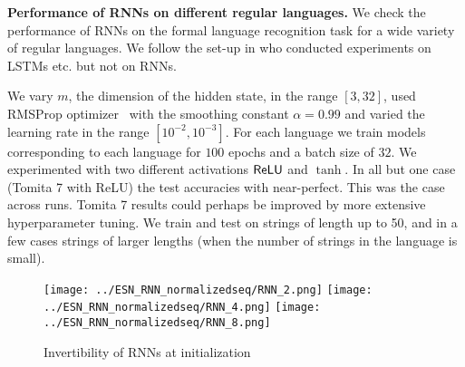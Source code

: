 \textbf{Performance of RNNs on different regular languages. } We check the performance of RNNs on the formal language recognition task for a wide variety of regular languages. We follow the set-up in \cite{BhattamishraAG20} who conducted experiments on LSTMs etc. but not on RNNs.


We vary $m$, the dimension of the hidden state, in the range $[3, 32]$, used RMSProp optimizer~\cite{hinton2014coursera} with the smoothing constant $\alpha = 0.99$ and varied the learning rate in the range $[10^{-2}, 10^{-3}]$. For each language
we train models corresponding to each language
for $100$ epochs and a batch size of $32$. We experimented with two different activations $\mathsf{ReLU}$ and $\tanh$. 
In all but one case (Tomita 7 with ReLU) the test accuracies with near-perfect. This was the case across runs. Tomita 7 results could perhaps be improved by more extensive hyperparameter tuning. 
We train and test on strings of length up to 50, and in a few cases strings of larger lengths (when the number of strings in the language is small). 




\iffalse
\begin{figure*}

\centering
\texttt{[image: ../ESN\_RNN\_normalizedseq/RNN\_2.png]}
\texttt{[image: ../ESN\_RNN\_normalizedseq/RNN\_4.png]}
\texttt{[image: ../ESN\_RNN\_normalizedseq/RNN\_8.png]}
\caption{Invertibility of RNNs at initialization}
\end{figure*}


